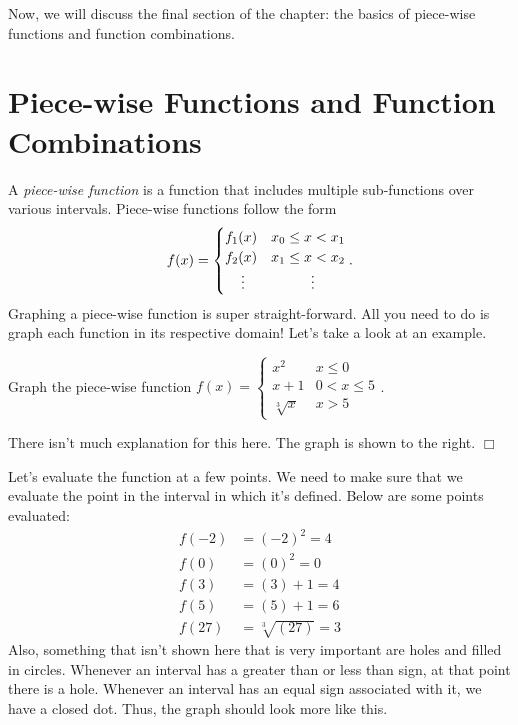 \documentclass[../book.tex]{subfiles}
\begin{document}
Now, we will discuss the final section of the chapter: the basics of piece-wise functions and function combinations.
\section{Piece-wise Functions and Function Combinations}
\noindent A \textit{piece-wise function} is a function that includes multiple sub-functions over various intervals.  Piece-wise functions follow the form $$f(x)=\begin{cases} f_1(x) & x_0\leq x<x_1 \\ f_2(x) & x_1\leq x<x_2 \\ \hspace{4mm}\vdots & \hspace{10mm}\vdots \end{cases}.$$
Graphing a piece-wise function is super straight-forward.  All you need to do is graph each function in its respective domain!  Let's take a look at an example.
\begin{example}
Graph the piece-wise function $f(x)=\begin{cases} x^2 & x \leq 0 \\ x+1 & 0 < x \leq 5 \\ \sqrt[3]{x} & x > 5 \end{cases}$.
\end{example}

\begin{wrapfigure}{r}{4cm}
    \centering
\end{wrapfigure}

\begin{solution}
There isn't much explanation for this here.  The graph is shown to the right.  $\Box$
\end{solution}
Let's evaluate the function at a few points.  We need to make sure that we evaluate the point in the interval in which it's defined.  Below are some points evaluated: \begin{align*}
    f(-2)&= (-2)^2=4 \\
    f(0)&= (0)^2=0 \\
    f(3)&= (3)+1=4 \\
    f(5)&= (5)+1=6 \\
    f(27)&= \sqrt[3]{(27)}=3
\end{align*}
Also, something that isn't shown here that is very important are holes and filled in circles.  Whenever an interval has a greater than or less than sign, at that point there is a hole.  Whenever an interval has an equal sign associated with it, we have a closed dot.  Thus, the graph should look more like this.  
\end{document}

